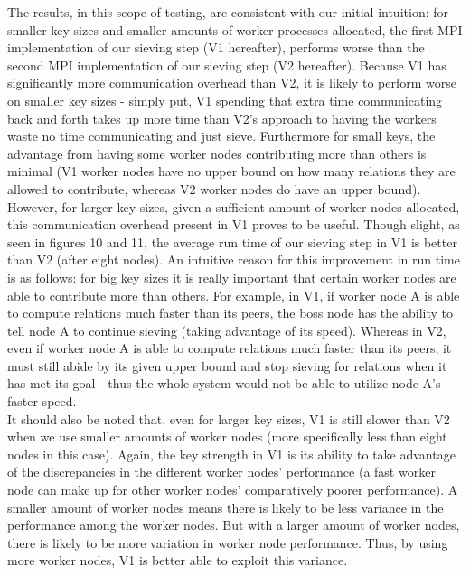 \documentclass[11pt,twocolumn]{article}
\begin{document}
The results, in this scope of testing, are consistent with our initial intuition: for smaller key sizes and smaller amounts of worker processes allocated, the first MPI implementation of our sieving step (V1 hereafter), performs worse than the second MPI implementation of our sieving step (V2 hereafter). Because V1 has significantly more communication overhead than V2, it is likely to perform worse on smaller key sizes - simply put, V1 spending that extra time communicating back and forth takes up more time than V2's approach to having the workers waste no time communicating and just sieve. Furthermore for small keys, the advantage from having some worker nodes contributing more than others is minimal (V1 worker nodes have no upper bound on how many relations they are allowed to contribute, whereas V2 worker nodes do have an upper bound).\\
\indent However, for larger key sizes, given a sufficient amount of worker nodes allocated, this communication overhead present in V1 proves to be useful. Though slight, as seen in figures 10 and 11, the average run time of our sieving step in V1 is better than V2 (after eight nodes). An intuitive reason for this improvement in run time is as follows: for big key sizes it is really important that certain worker nodes are able to contribute more than others. For example, in V1, if worker node A is able to compute relations much faster than its peers, the boss node has the ability to tell node A to continue sieving (taking advantage of its speed). Whereas in V2, even if worker node A is able to compute relations much faster than its peers, it must still abide by its given upper bound and stop sieving for relations when it has met its goal - thus the whole system would not be able to utilize node A's faster speed.\\
\indent It should also be noted that, even for larger key sizes, V1 is still slower than V2 when we use smaller amounts of worker nodes (more specifically less than eight nodes in this case). Again, the key strength in V1 is its ability to take advantage of the discrepancies in the different worker nodes' performance (a fast worker node can make up for other worker nodes' comparatively poorer performance). A smaller amount of worker nodes means there is likely to be less variance in the performance among the worker nodes. But with a larger amount of worker nodes, there is likely to be more variation in worker node performance. Thus, by using more worker nodes, V1 is better able to exploit this variance.
\end{document}
